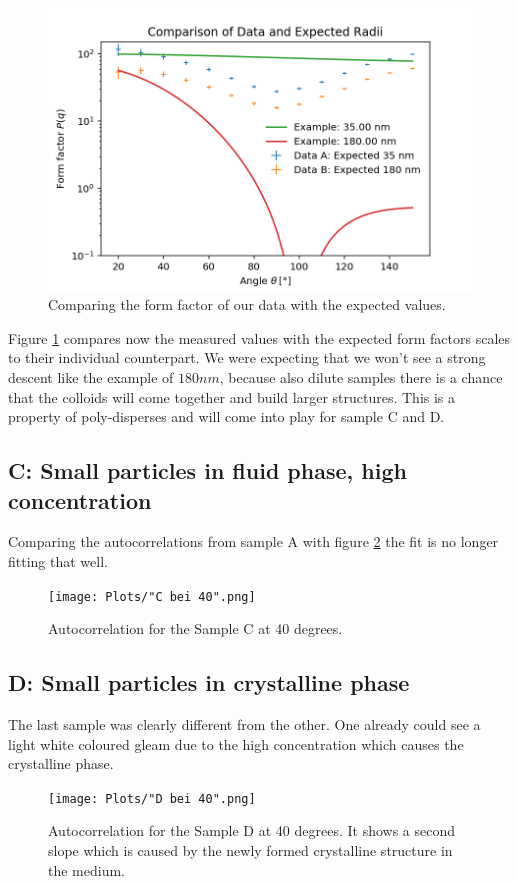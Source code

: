 \documentclass[]{article}
\begin{document}
\begin{figure}[!htbp]
\centering
\includegraphics[width=0.8\linewidth]{Plots/Comparison.png}
\caption{Comparing the form factor of our data with the expected values.}
\label{AB comparison}
\end{figure}

Figure \ref{AB comparison} compares now the measured values with the expected form factors scales to their individual counterpart.
We were expecting that we won't see a strong descent like the example of $180nm$, because also dilute samples there is a chance that the colloids will come together and build larger structures. This is a property of poly-disperses and will come into play for sample C and D. 


\subsection{C: Small particles in fluid phase, high concentration}
Comparing the autocorrelations from sample A with figure \ref{C} the fit is no longer fitting that well. 

\begin{figure}[!htbp]
\centering
\texttt{[image: Plots/"C bei 40".png]}
\caption{Autocorrelation for the Sample C at 40 degrees.}
\label{C}
\end{figure}


\subsection{D: Small particles in crystalline phase}
The last sample was clearly different from the other. One already could see a light white coloured gleam due to the high concentration which causes the crystalline phase. 

\begin{figure}[!htbp]
\centering
\texttt{[image: Plots/"D bei 40".png]}
\caption{Autocorrelation for the Sample D at 40 degrees. It shows a second slope which is caused by the newly formed crystalline structure in the medium.}
\label{D}
\end{figure}
\end{document}
